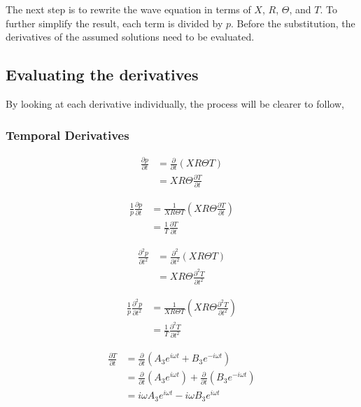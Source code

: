 \documentclass[a4paper]{article}
\begin{document}
The next step is to rewrite the wave equation in terms of $X$, $R$, $\Theta$,
and $T$. To further simplify the result, each term is divided by $p$.
Before the substitution, the derivatives of the assumed solutions need to be
evaluated.

\subsection{Evaluating the derivatives}
By looking at each derivative individually, the process will be clearer to 
follow,
\subsubsection{Temporal Derivatives}


\begin{align*}
    \frac{\partial p}{\partial t} 
    &=
    \frac{\partial }{\partial t}  \left( XR\Theta T \right) \\
    &=
    XR\Theta\frac{\partial T}{\partial t}  
\end{align*}

\begin{align*}
    \frac{1}{p}\frac{\partial p}{\partial t} 
    &=
    \frac{ 1}{X R \Theta T}  \left( XR\Theta\frac{\partial T}{\partial t} \right) \\
    &=\frac{ 1}{ T}\frac{\partial T}{\partial t}  
\end{align*}

\begin{align*}
    \frac{\partial^2 p}{\partial t^2} 
    &=
    \frac{\partial^2 }{\partial t^2}  \left( XR\Theta T \right) \\
    &=
    XR\Theta\frac{\partial^2 T}{\partial t^2}  
\end{align*}

\begin{align*}
    \frac{1}{p}\frac{\partial^2 p}{\partial t^2} 
    &=
    \frac{ 1}{X R \Theta T}  \left( XR\Theta\frac{\partial^2 T}{\partial t^2} \right) \\
    &=\frac{ 1}{ T}\frac{\partial^2 T}{\partial t^2}  
\end{align*}

\begin{align*}
    \frac{\partial T}{\partial t} &=
    \frac{\partial}{\partial t}
        \left( 
        A_3 e^{i \omega t} + B_3 e^{-i \omega t}
    \right)  \\
    &=
    \frac{\partial}{\partial t} \left(A_3 e^{i \omega t}  \right) +
    \frac{\partial}{\partial t} \left(B_3 e^{-i \omega t}  \right)\\ 
    &= i \omega A_3 e^{i \omega t} - i \omega B_3 e^{i \omega t} 
\end{align*}
\end{document}
